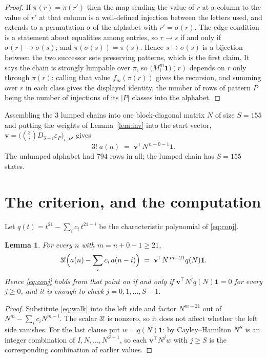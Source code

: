 \documentclass[11pt,a4paper]{article}
\theoremstyle{plain}
\newtheorem{lemma}[theorem]{Lemma}
\theoremstyle{definition}
\begin{document}
\begin{proof}
If $\pi(r)=\pi(r')$ then the map sending the value of $r$ at a column to the value of $r'$
at that column is a well-defined injection between the letters used, and extends to a
permutation $\sigma$ of the alphabet with $r'=\sigma(r)$. The edge condition is a statement
about equalities among entries, so $r\to s$ if and only if $\sigma(r)\to\sigma(s)$; and
$\pi(\sigma(s))=\pi(s)$. Hence $s\mapsto\sigma(s)$ is a bijection between the two successor
sets preserving patterns, which is the first claim. It says the chain is strongly lumpable
over $\pi$, so $\bigl(M_i^{m}\mathbf{1}\bigr)(r)$ depends on $r$ only through $\pi(r)$;
calling that value $f_m(\pi(r))$ gives the recursion, and summing over $r$ in each class
gives the displayed identity, the number of rows of pattern $P$ being the number of
injections of its $|P|$ classes into the alphabet.
\end{proof}

Assembling the $3$ lumped chains into one block-diagonal matrix $N$ of size $S=155$ and
putting the weights of Lemma~\ref{lem:inv} into the start vector,
$\mathbf{v}=\bigl(\binom{3}{i}D_{3-i}\varepsilon_P\bigr)_{i,P}$, gives
\begin{equation}\label{eq:walk}
3!\;a(n)\;=\;\mathbf{v}^{\!\top}N^{\,n+0-1}\mathbf{1} .
\end{equation}
The unlumped alphabet had $794$ rows in all; the lumped chain has $S=155$ states.

\section{The criterion, and the computation}

Let $q(t)=t^{21}-\sum_i c_i\,t^{21-i}$ be the characteristic polynomial of
\eqref{eq:conj}.

\begin{lemma}\label{lem:crit}
For every $n$ with $m=n+0-1\ge21$,
\[
3!\Bigl(a(n)-\sum_i c_i\,a(n-i)\Bigr)\;=\;\mathbf{v}^{\!\top}N^{\,m-21}q(N)\mathbf{1} .
\]
Hence \eqref{eq:conj} holds from that point on if and only if
$\mathbf{v}^{\!\top}N^{j}q(N)\mathbf{1}=0$ for every $j\ge0$, and it is enough to check
$j=0,1,\dots,S-1$.
\end{lemma}

\begin{proof}
Substitute \eqref{eq:walk} into the left side and factor $N^{m-21}$ out of
$N^{m}-\sum_i c_iN^{m-i}$. The scalar $3!$ is nonzero, so it does not affect whether
the left side vanishes. For the last clause put $w=q(N)\mathbf{1}$: by Cayley--Hamilton
$N^{S}$ is an integer combination of $I,N,\dots,N^{S-1}$, so each
$\mathbf{v}^{\!\top}N^{j}w$ with $j\ge S$ is the corresponding combination of earlier
values.
\end{proof}
\end{document}
